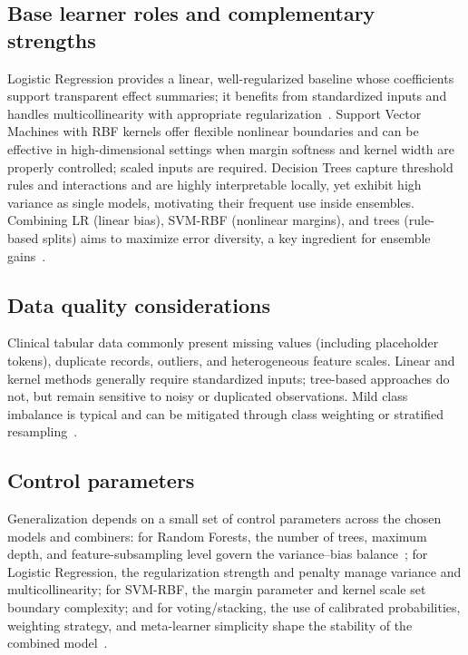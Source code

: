 \documentclass[conference]{IEEEtran}
\begin{document}
\subsection{Base learner roles and complementary strengths}
Logistic Regression provides a linear, well-regularized baseline whose coefficients support transparent effect summaries; it benefits from standardized inputs and handles multicollinearity with appropriate regularization~\cite{kelleher2020fundamentals}.
Support Vector Machines with RBF kernels offer flexible nonlinear boundaries and can be effective in high-dimensional settings when margin softness and kernel width are properly controlled; scaled inputs are required.
Decision Trees capture threshold rules and interactions and are highly interpretable locally, yet exhibit high variance as single models, motivating their frequent use inside ensembles.
Combining LR (linear bias), SVM-RBF (nonlinear margins), and trees (rule-based splits) aims to maximize error diversity, a key ingredient for ensemble gains~\cite{zhou2012ensemble,kelleher2020fundamentals}.

\subsection{Data quality considerations}
Clinical tabular data commonly present missing values (including placeholder tokens), duplicate records, outliers, and heterogeneous feature scales. Linear and kernel methods generally require standardized inputs; tree-based approaches do not, but remain sensitive to noisy or duplicated observations. Mild class imbalance is typical and can be mitigated through class weighting or stratified resampling~\cite{kelleher2020fundamentals}.

\subsection{Control parameters}
Generalization depends on a small set of control parameters across the chosen models and combiners:
for Random Forests, the number of trees, maximum depth, and feature-subsampling level govern the variance--bias balance~\cite{breiman2001random};
for Logistic Regression, the regularization strength and penalty manage variance and multicollinearity;
for SVM-RBF, the margin parameter and kernel scale set boundary complexity; and
for voting/stacking, the use of calibrated probabilities, weighting strategy, and meta-learner simplicity shape the stability of the combined model~\cite{kelleher2020fundamentals,zhou2012ensemble}.
\end{document}
